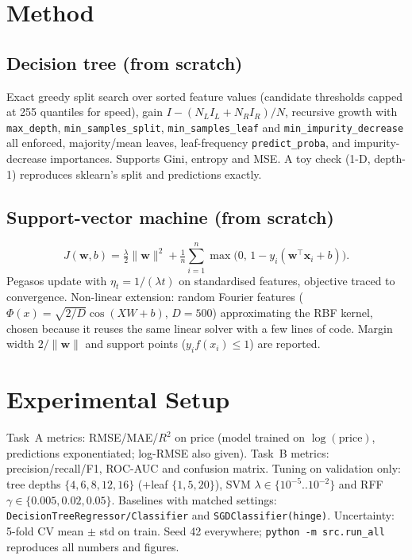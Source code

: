 \documentclass[10pt,twocolumn,a4paper]{article}
\begin{document}
\section{Method}
\subsection{Decision tree (from scratch)}
Exact greedy split search over sorted feature values (candidate
thresholds capped at 255 quantiles for speed), gain
$I{-}(N_L I_L{+}N_R I_R)/N$, recursive growth with
\texttt{max\_depth}, \texttt{min\_samples\_split},
\texttt{min\_samples\_leaf} and \texttt{min\_impurity\_decrease} all
enforced, majority/mean leaves, leaf-frequency \texttt{predict\_proba},
and impurity-decrease importances. Supports Gini, entropy and MSE.
A toy check (1-D, depth-1) reproduces sklearn's split and predictions exactly.

\subsection{Support-vector machine (from scratch)}
\begin{equation}
  J(\mathbf{w},b)=\tfrac{\lambda}{2}\lVert\mathbf{w}\rVert^{2}
  +\tfrac{1}{n}\sum_{i=1}^{n}\max\!\big(0,\,1-y_i(\mathbf{w}^{\top}\mathbf{x}_i+b)\big).
\end{equation}
Pegasos update with $\eta_t{=}1/(\lambda t)$ on standardised features,
objective traced to convergence. Non-linear extension: random Fourier
features ($\Phi(x){=}\sqrt{2/D}\cos(XW{+}b)$, $D{=}500$) approximating
the RBF kernel, chosen because it reuses the same linear solver with a
few lines of code. Margin width $2/\lVert\mathbf{w}\rVert$ and support
points ($y_i f(x_i){\le}1$) are reported.

\section{Experimental Setup}
Task~A metrics: RMSE/MAE/$R^2$ on price (model trained on
$\log(\mathrm{price})$, predictions exponentiated; log-RMSE also given).
Task~B metrics: precision/recall/F1, ROC-AUC and confusion matrix.
Tuning on validation only: tree depths $\{4,6,8,12,16\}$ (+leaf
$\{1,5,20\}$), SVM $\lambda{\in}\{10^{-5}{..}10^{-2}\}$ and RFF
$\gamma{\in}\{0.005,0.02,0.05\}$. Baselines with matched settings:
\texttt{DecisionTreeRegressor/Classifier} and
\texttt{SGDClassifier(hinge)}. Uncertainty: 5-fold CV mean $\pm$ std on
train. Seed 42 everywhere; \texttt{python -m src.run\_all} reproduces
all numbers and figures.
\end{document}
